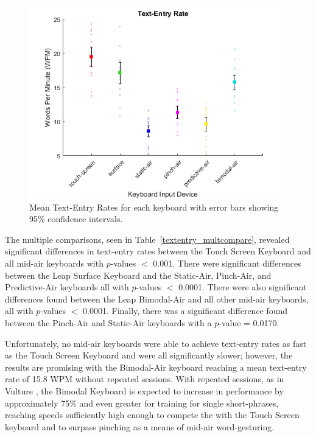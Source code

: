 \begin{figure}[h]
	\centering
	\includegraphics{fig_textentry_mean}
	\caption[Mean Text-Entry Rates]{Mean Text-Entry Rates for each keyboard with error bars showing 95\% confidence intervals.}
	\label{fig_textentry_mean}
\end{figure}

The multiple comparisons, seen in Table~\ref{textentry_multcompare}, revealed significant differences in text-entry rates between the Touch Screen Keyboard and all mid-air keyboards with $p$-values $<$ 0.001. There were significant differences between the Leap Surface Keyboard and the Static-Air, Pinch-Air, and Predictive-Air keyboards all with $p$-values $<$ 0.0001. There were also significant differences found between the Leap Bimodal-Air and all other mid-air keyboards, all with $p$-values $<$ 0.0001. Finally, there was a significant difference found between the Pinch-Air and Static-Air keyboards with a $p$-value = 0.0170.

Unfortunately, no mid-air keyboards were able to achieve text-entry rates as fast as the Touch Screen Keyboard and were all significantly slower; however, the results are promising with the Bimodal-Air keyboard reaching a mean text-entry rate of 15.8 WPM without repeated sessions. With repeated sessions, as in Vulture \cite{ref_vulture}, the Bimodal Keyboard is expected to increase in performance by approximately 75\% and even greater for training for single short-phrases, reaching speeds sufficiently high enough to compete the with the Touch Screen keyboard and to surpass pinching as a means of mid-air word-gesturing.

